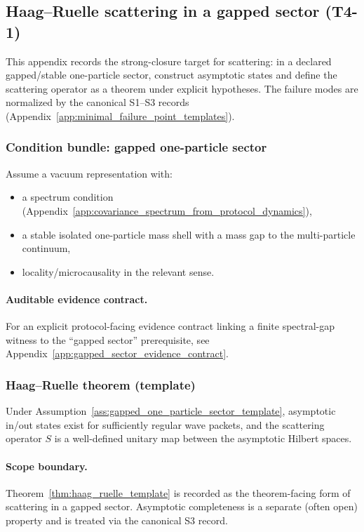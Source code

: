 \subsection{Haag--Ruelle scattering in a gapped sector (T4-1)}
\label{app:scattering_haag_ruelle_theorems}

\AuditTag This appendix records the strong-closure target for scattering: in a declared gapped/stable one-particle sector, construct asymptotic states and define the scattering operator as a theorem under explicit hypotheses.
The failure modes are normalized by the canonical S1--S3 records (Appendix~\ref{app:minimal_failure_point_templates}).

\subsubsection{Condition bundle: gapped one-particle sector}
\begin{assumption}
\label{ass:gapped_one_particle_sector_template}
Assume a vacuum representation with:
\begin{itemize}
\item a spectrum condition (Appendix~\ref{app:covariance_spectrum_from_protocol_dynamics}),
\item a stable isolated one-particle mass shell with a mass gap to the multi-particle continuum,
\item locality/microcausality in the relevant sense.
\end{itemize}
\end{assumption}

\paragraph{Auditable evidence contract.}
\AuditTag For an explicit protocol-facing evidence contract linking a finite spectral-gap witness to the ``gapped sector'' prerequisite, see Appendix~\ref{app:gapped_sector_evidence_contract}.

\subsubsection{Haag--Ruelle theorem (template)}
\begin{theorem}
\label{thm:haag_ruelle_template}
\MathTag Under Assumption~\ref{ass:gapped_one_particle_sector_template}, asymptotic in/out states exist for sufficiently regular wave packets, and the scattering operator $S$ is a well-defined unitary map between the asymptotic Hilbert spaces.
\end{theorem}

\paragraph{Scope boundary.}
\AuditTag Theorem~\ref{thm:haag_ruelle_template} is recorded as the theorem-facing form of scattering in a gapped sector.
Asymptotic completeness is a separate (often open) property and is treated via the canonical S3 record.

